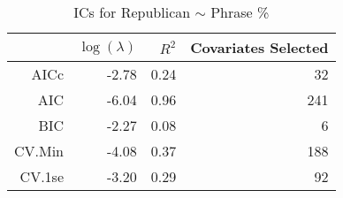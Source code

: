 \begin{table}[ht]
\centering
\begin{tabular}{rrrr}
  \hline
 & $\log(\lambda)$ & $R^2$ & Covariates Selected \\ 
  \hline
AICc & -2.78 & 0.24 &  32 \\ 
  AIC & -6.04 & 0.96 & 241 \\ 
  BIC & -2.27 & 0.08 &   6 \\ 
  CV.Min & -4.08 & 0.37 & 188 \\ 
  CV.1se & -3.20 & 0.29 &  92 \\ 
   \hline
\end{tabular}
\caption{ICs for Republican $\sim$ Phrase \%} 
\label{tab:repx}
\end{table}
